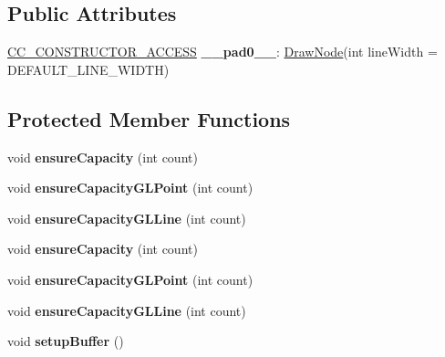 \subsection*{Public Attributes}
\begin{DoxyCompactItemize}
\item 
\mbox{\label{classDrawNode_a82ad96bd2634ec45072dab73be58c2f1}} 
\hyperlink{_2cocos2d_2cocos_2base_2ccConfig_8h_a25ef1314f97c35a2ed3d029b0ead6da0}{C\+C\+\_\+\+C\+O\+N\+S\+T\+R\+U\+C\+T\+O\+R\+\_\+\+A\+C\+C\+E\+SS} {\bfseries \+\_\+\+\_\+pad0\+\_\+\+\_\+}\+: \hyperlink{classDrawNode}{Draw\+Node}(int line\+Width = D\+E\+F\+A\+U\+L\+T\+\_\+\+L\+I\+N\+E\+\_\+\+W\+I\+D\+TH)
\end{DoxyCompactItemize}
\subsection*{Protected Member Functions}
\begin{DoxyCompactItemize}
\item 
\mbox{\label{classDrawNode_a6d2a7257460123b096a646682c4b63e6}} 
void {\bfseries ensure\+Capacity} (int count)
\item 
\mbox{\label{classDrawNode_a9ad4710044c6087b49968fb322b0eefc}} 
void {\bfseries ensure\+Capacity\+G\+L\+Point} (int count)
\item 
\mbox{\label{classDrawNode_a5b3695ec41d24afcb889cc8117150ddb}} 
void {\bfseries ensure\+Capacity\+G\+L\+Line} (int count)
\item 
\mbox{\label{classDrawNode_a6d2a7257460123b096a646682c4b63e6}} 
void {\bfseries ensure\+Capacity} (int count)
\item 
\mbox{\label{classDrawNode_a9ad4710044c6087b49968fb322b0eefc}} 
void {\bfseries ensure\+Capacity\+G\+L\+Point} (int count)
\item 
\mbox{\label{classDrawNode_a5b3695ec41d24afcb889cc8117150ddb}} 
void {\bfseries ensure\+Capacity\+G\+L\+Line} (int count)
\item 
\mbox{\label{classDrawNode_abf171f04cef7ebdd046bf7edf1334714}} 
void {\bfseries setup\+Buffer} ()
\end{DoxyCompactItemize}
